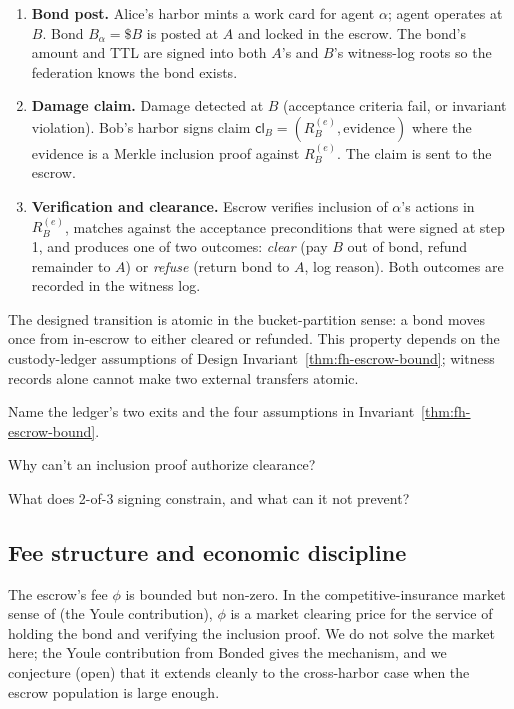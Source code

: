 \documentclass[11pt,a4paper]{article}
\theoremstyle{definition}
\theoremstyle{remark}
\begin{document}
\begin{enumerate}[nosep]
\item \textbf{Bond post.} Alice's harbor mints a work card for agent $\alpha$; agent operates at $B$. Bond $B_\alpha = \$B$ is posted at $A$ and locked in the escrow. The bond's amount and TTL are signed into both $A$'s and $B$'s witness-log roots so the federation knows the bond exists.
\item \textbf{Damage claim.} Damage detected at $B$ (acceptance criteria fail, or invariant violation). Bob's harbor signs claim $\mathsf{cl}_B = (R_B^{(e)}, \mathrm{evidence})$ where the evidence is a Merkle inclusion proof against $R_B^{(e)}$. The claim is sent to the escrow.
\item \textbf{Verification and clearance.} Escrow verifies inclusion of $\alpha$'s actions in $R_B^{(e)}$, matches against the acceptance preconditions that were signed at step 1, and produces one of two outcomes: \emph{clear} (pay $B$ out of bond, refund remainder to $A$) or \emph{refuse} (return bond to $A$, log reason). Both outcomes are recorded in the witness log.
\end{enumerate}

The designed transition is atomic in the bucket-partition sense: a bond moves once from in-escrow to either cleared or refunded. This property depends on the custody-ledger assumptions of Design Invariant~\ref{thm:fh-escrow-bound}; witness records alone cannot make two external transfers atomic.

\begin{pdrecitation}
\item Name the ledger's two exits and the four assumptions in Invariant~\ref{thm:fh-escrow-bound}.
\item Why can't an inclusion proof authorize clearance?
\item What does 2-of-3 signing constrain, and what can it not prevent?
\end{pdrecitation}

\subsection{Fee structure and economic discipline}\label{sec:fh-econ}

The escrow's fee $\phi$ is bounded but non-zero. In the competitive-insurance market sense of  (the Youle contribution), $\phi$ is a market clearing price for the service of holding the bond and verifying the inclusion proof. We do not solve the market here; the Youle contribution from Bonded gives the mechanism, and we conjecture (open) that it extends cleanly to the cross-harbor case when the escrow population is large enough.
\end{document}
